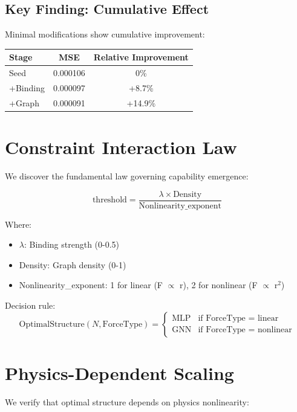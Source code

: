 \documentclass{article}
\begin{document}
\subsection{Key Finding: Cumulative Effect}

Minimal modifications show cumulative improvement:
\begin{center}
\begin{tabular}{l|c|c}
Stage & MSE & Relative Improvement \\
\hline
Seed & 0.000106 & 0\% \\
+Binding & 0.000097 & +8.7\% \\
+Graph & 0.000091 & +14.9\% \\
\end{tabular}
\end{center}

\section{Constraint Interaction Law}

We discover the fundamental law governing capability emergence:

\begin{equation}
\text{threshold} = \frac{\lambda \times \text{Density}}{\text{Nonlinearity\_exponent}}
\end{equation}

Where:
\begin{itemize}
\item $\lambda$: Binding strength (0-0.5)
\item Density: Graph density (0-1)
\item Nonlinearity\_exponent: 1 for linear (F $\propto$ r), 2 for nonlinear (F $\propto$ r$^2$)
\end{itemize}

Decision rule:
\begin{equation}
\text{OptimalStructure}(N, \text{ForceType}) = 
\begin{cases}
\text{MLP} & \text{if ForceType = linear} \\
\text{GNN} & \text{if ForceType = nonlinear}
\end{cases}
\end{equation}

\section{Physics-Dependent Scaling}

We verify that optimal structure depends on physics nonlinearity:
\end{document}
